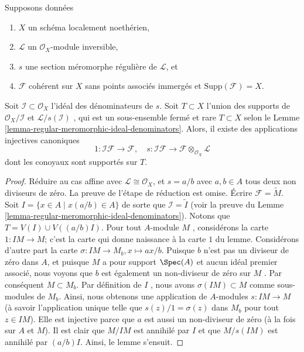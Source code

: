 \begin{lemma}
\label{lemma-make-maps-regular-section}
Supposons données
\begin{enumerate}
\item $X$  un schéma localement noethérien,
\item $\mathcal{L}$  un  $\mathcal{O}_X$-module inversible,
\item $s$  une section méromorphe régulière de  $\mathcal{L}$, et
\item $\mathcal{F}$  cohérent sur  $X$  sans points associés immergés et
 $\text{Supp}(\mathcal{F}) = X$.
\end{enumerate}
Soit  $\mathcal{I} \subset \mathcal{O}_X$  l'idéal des dénominateurs de  $s$. Soit  $T \subset X$ 
l'union des supports de  $\mathcal{O}_X/\mathcal{I}$  et  $\mathcal{L}/s(\mathcal{I})$ , qui est un sous-ensemble
fermé et rare  $T \subset X$  selon le Lemme  \ref{lemma-regular-meromorphic-ideal-denominators}. Alors, il existe des
applications injectives canoniques
$$
1 : \mathcal{I}\mathcal{F} \to \mathcal{F}, \quad
s : \mathcal{I}\mathcal{F} \to \mathcal{F} \otimes_{\mathcal{O}_X}\mathcal{L}
$$
dont les conoyaux sont supportés sur  $T$.
\end{lemma}

\begin{proof}
Réduire au cas affine avec  $\mathcal{L} \cong \mathcal{O}_X$, et  $s = a/b$  avec  $a, b \in A$  tous
deux non diviseurs de zéro. La preuve de l'étape de réduction est omise. Écrire
 $\mathcal{F} = \widetilde{M}$. Soit  $I = \{x \in A \mid x(a/b) \in A\}$  de sorte que  $\mathcal{I} = \widetilde{I}$  (voir la preuve du Lemme
 \ref{lemma-regular-meromorphic-ideal-denominators}). Notons que  $T = V(I) \cup V((a/b)I)$. Pour tout  $A$-module
 $M$ , considérons la carte  $1 : IM \to M$; c'est la carte qui donne
naissance à la carte  $1$  du lemme. Considérons d'autre part la carte
 $\sigma : IM \to M_b, x \mapsto ax/b$. Puisque  $b$  n'est pas un diviseur de zéro dans
 $A$, et puisque  $M$  a pour support  $\Spec(A)$  et aucun idéal
premier associé, nous voyons que  $b$  est également un non-diviseur de
zéro sur  $M$ . Par conséquent  $M \subset M_b$. Par définition de
 $I$ , nous avons  $\sigma(IM) \subset M$  comme sous-modules de  $M_b$. Ainsi,
nous obtenons une application de  $A$-modules  $s : IM \to M$  (à savoir
l'application unique telle que  $s(z)/1 = \sigma(z)$  dans  $M_b$  pour tout
 $z \in IM$). Elle est injective parce que  $a$  est aussi un non-diviseur
de zéro (à la fois sur  $A$  et  $M$). Il est clair que
 $M/IM$  est annihilé par  $I$  et que  $M/s(IM)$  est annihilé par
 $(a/b)I$. Ainsi, le lemme s'ensuit.
\end{proof}





